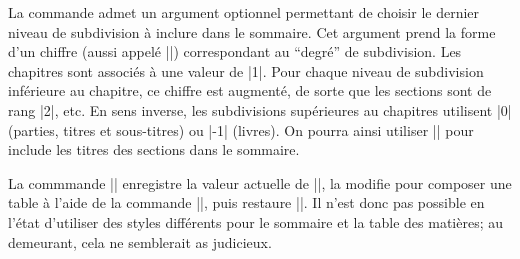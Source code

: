 \begin{macro}
	\shortcontents
	\shortcontents*
\end{macro}

La commande admet un argument optionnel permettant de choisir le dernier niveau de subdivision à inclure dans le sommaire. Cet argument prend la forme d'un chiffre (aussi appelé |\tocdepth|) correspondant au \enquote{degré} de subdivision. Les chapitres sont associés à une valeur de |1|. Pour chaque niveau de subdivision inférieure au chapitre, ce chiffre est augmenté, de sorte que les sections sont de rang |2|, etc. En sens inverse, les subdivisions supérieures au chapitres utilisent |0| (parties, titres et sous-titres) ou |-1| (livres). On pourra ainsi utiliser |\shortcontents[2]| pour include les titres des sections dans le sommaire.

\begin{noprint}
\newcommand{\shortcontents}{\@ifstar{\s@shortcontents}{\@shortcontents}}

\newcommand{\s@shortcontents}[1][0]{%
	\@@shortcontents[#1]{\tableofcontents*}
}
\newcommand{\@shortcontents}[1][0]{%
	\@@shortcontents[#1]{\tableofcontents}
}

\newcommand{\@@shortcontents}[2][]{
	\bgroup
		\let\contentsname=\shortcontentsname
		\cftpagenumbersoff{heading}
		\cftpagenumbersoff{subheading}
		\cftpagenumbersoff{chapter}
		\cftpagenumbersoff{section}
		\cftpagenumbersoff{subsection}
		\cftpagenumbersoff{subsubsection}
		\cftpagenumbersoff{paragraph}
		\cftpagenumbersoff{subparagraph}
		\@precisfalse
		\let\cftafterprecis=\relax
		\let\cftbeforeprecis=\relax
		\newcounter{save@tocdepth}
		\setcounter{save@tocdepth}{\value{tocdepth}}
		\setcounter{tocdepth}{#1}
		#2
		\setcounter{tocdepth}{\value{save@tocdepth}}
		\clearpage
	\egroup}
\end{noprint}

\begin{developer}
La commmande |\shortcontents| enregistre la valeur actuelle de |\tocdepth|, la modifie pour composer une table à l'aide de la commande |\tableofcontents|, puis restaure |\tocdepth|. Il n'est donc pas possible en l'état d'utiliser des styles différents pour le sommaire et la table des matières; au demeurant, cela ne semblerait as judicieux.
\end{developer}

